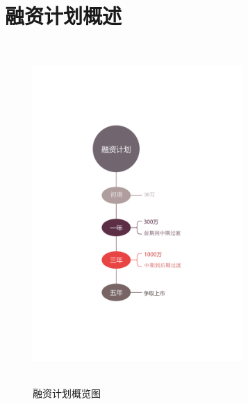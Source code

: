 \section{融资计划概述}
\begin{figure}[H]
	\centering
	\includegraphics[width=8cm,height=13cm]{figures/rzjh}
	\caption{融资计划概览图}
	\label{fg:rzjh}
\end{figure}